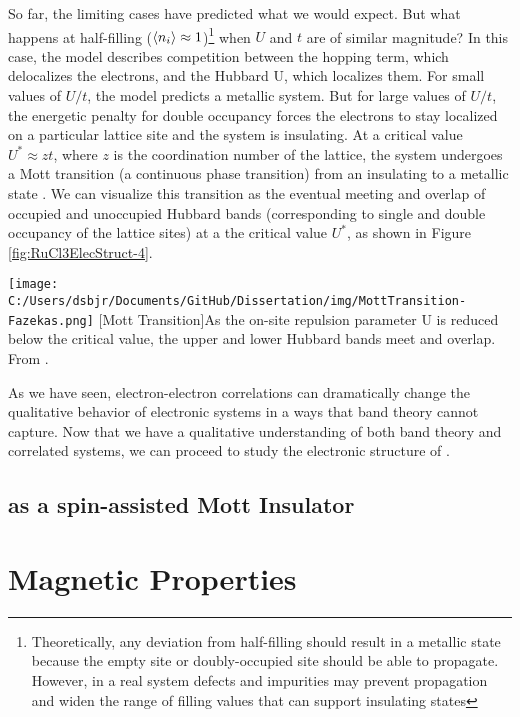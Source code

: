 So far, the limiting cases have predicted what we would expect. But what happens at half-filling ($\braket{n_{i}} \approx 1$)\footnote{Theoretically, any deviation from half-filling should result in a metallic state because the empty site or doubly-occupied site should be able to propagate. However, in a real system defects and impurities may prevent propagation and widen the range of filling values that can support insulating states} when $U$ and $t$ are of similar magnitude? In this case, the model describes competition between the hopping term, which delocalizes the electrons, and the Hubbard U, which localizes them. For small values of $U/t$, the model predicts a metallic system. But for large values of $U/t$, the energetic penalty for double occupancy forces the electrons to stay localized on a particular lattice site and the system is insulating. At a critical value $U^{*} \approx z t$, where $z$ is the coordination number of the lattice, the system undergoes a Mott transition (a continuous phase transition) from an insulating to a metallic state \cite{Fazekas}. We can visualize this transition as the eventual meeting and overlap of occupied and unoccupied Hubbard bands (corresponding to single and double occupancy of the lattice sites) at a the critical value $U^{*}$, as shown in Figure \ref{fig:RuCl3ElecStruct-4}.

\begin{centering}
\texttt{[image: C:/Users/dsbjr/Documents/GitHub/Dissertation/img/MottTransition-Fazekas.png]}
  \captionsetup{width=0.75\textwidth}
  [Mott Transition]{As the on-site repulsion parameter U is reduced below the critical value, the upper and lower Hubbard bands meet and overlap. From \cite{Fazekas1990}.} 
  \label{fig:RuCl3ElecStruct-4}
\end{centering}

As we have seen, electron-electron correlations can dramatically change the qualitative behavior of electronic systems in a ways that band theory cannot capture. Now that we have a qualitative understanding of both band theory and correlated systems, we can proceed to study the electronic structure of \ruclnospace .

\subsection{\texorpdfstring{\rucl}{RuCl3}as a spin-assisted Mott Insulator}


\section{Magnetic Properties}

